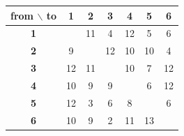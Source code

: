 \begin{tabular}{c|cccccc}
from $\backslash$ to & 1 & 2 & 3 & 4 & 5 & 6\\\hline
\textbf{1} & \cellcolor{black!12} & 11 & 4 & 12 & 5 & 6\\
\textbf{2} & 9 & \cellcolor{black!12} & 12 & 10 & 10 & 4\\
\textbf{3} & 12 & 11 & \cellcolor{black!12} & 10 & 7 & 12\\
\textbf{4} & 10 & 9 & 9 & \cellcolor{black!12} & 6 & 12\\
\textbf{5} & 12 & 3 & 6 & 8 & \cellcolor{black!12} & 6\\
\textbf{6} & 10 & 9 & 2 & 11 & 13 & \cellcolor{black!12}\\
\end{tabular}
